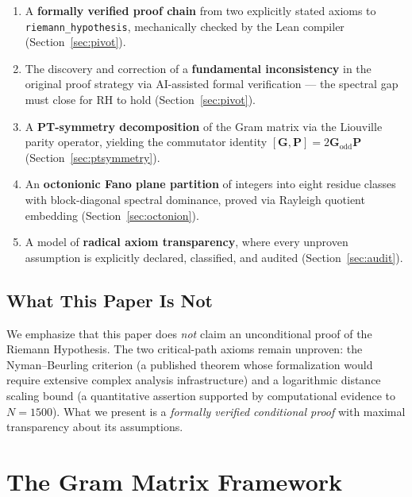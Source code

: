 \documentclass[11pt,a4paper]{article}
\theoremstyle{definition}
\theoremstyle{remark}
\newcommand{\Gram}{\mathbf{G}}
\newcommand{\Godd}{\mathbf{G}_{\mathrm{odd}}}
\newcommand{\Parity}{\mathbf{P}}
\newcommand{\lean}[1]{\texttt{#1}}
\begin{document}
\begin{enumerate}
  \item A \textbf{formally verified proof chain} from two explicitly stated
    axioms to \lean{riemann\_hypothesis}, mechanically checked by the Lean
    compiler (Section~\ref{sec:pivot}).

  \item The discovery and correction of a \textbf{fundamental inconsistency}
    in the original proof strategy via AI-assisted formal verification ---
    the spectral gap must close for RH to hold (Section~\ref{sec:pivot}).

  \item A \textbf{PT-symmetry decomposition} of the Gram matrix via the
    Liouville parity operator, yielding the commutator identity
    $[\Gram, \Parity] = 2\Godd\Parity$ (Section~\ref{sec:ptsymmetry}).

  \item An \textbf{octonionic Fano plane partition} of integers into eight
    residue classes with block-diagonal spectral dominance, proved via
    Rayleigh quotient embedding (Section~\ref{sec:octonion}).

  \item A model of \textbf{radical axiom transparency}, where every
    unproven assumption is explicitly declared, classified, and audited
    (Section~\ref{sec:audit}).
\end{enumerate}

\subsection{What This Paper Is Not}

We emphasize that this paper does \emph{not} claim an unconditional proof
of the Riemann Hypothesis. The two critical-path axioms remain unproven:
the Nyman--Beurling criterion (a published theorem whose formalization
would require extensive complex analysis infrastructure) and a logarithmic
distance scaling bound (a quantitative assertion supported by computational
evidence to $N = 1500$). What we present is a \emph{formally verified
conditional proof} with maximal transparency about its assumptions.

\section{The Gram Matrix Framework}\label{sec:gram}
\end{document}
